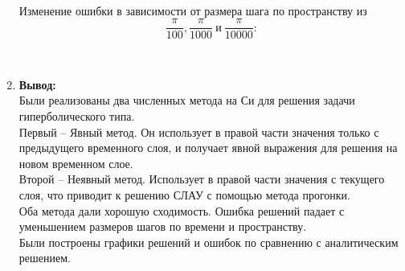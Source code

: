 \documentclass[12pt]{article}
\begin{document}
\begin{enumerate}
        \begin{figure}[h]
            \label{ris:image}
        \end{figure}\\

        Изменение ошибки в зависимости от размера шага по пространству из 
        $$\frac{\pi}{100},\frac{\pi}{1000}~и~\frac{\pi}{10000}:$$
        \begin{figure}[h]
            \label{ris:image}
        \end{figure}\\
        \newpage
        
        \item \textbf{Вывод:}\\
        Были реализованы два численных метода на Си для решения задачи 
        гиперболического типа.
        \\Первый – Явный метод. Он использует в правой части значения только с 
        предыдущего временного слоя,  и получает явной выражения для решения на
        новом временном слое.
        \\Второй – Неявный метод. Использует в правой части значения с текущего 
        слоя, что приводит к решению СЛАУ с помощью метода прогонки.
        \\Оба метода дали хорошую сходимость. Ошибка решений падает с уменьшением 
        размеров шагов по времени и пространству. 
        \\Были построены графики решений и ошибок по сравнению с аналитическим 
        решением. 
        
    \end{enumerate}
\end{document}
